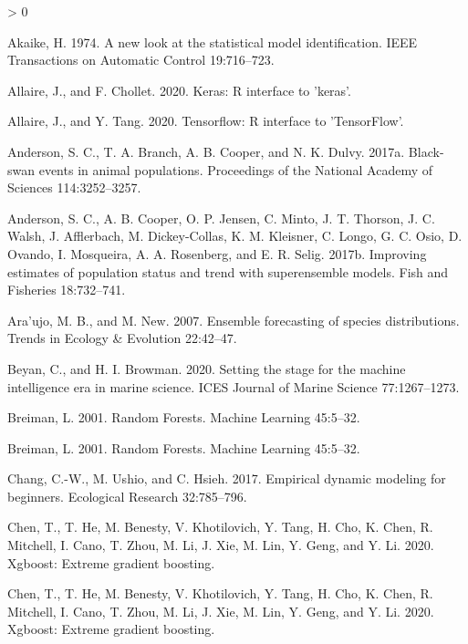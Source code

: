 \documentclass[
]{article}
\newlength{\cslhangindent}
\newenvironment{CSLReferences}[2] %
 {%
  \setlength{\parindent}{0pt}
  \ifodd #1 \everypar{\setlength{\hangindent}{\cslhangindent}}\ignorespaces\fi
  \ifnum #2 > 0
  \setlength{\parskip}{#2\baselineskip}
  \fi
 }%
 {}
\begin{document}
\hypertarget{refs}{}
\begin{CSLReferences}{1}{0}
\leavevmode\hypertarget{ref-akaike1974}{}%
Akaike, H. 1974. A new look at the statistical model identification. IEEE Transactions on Automatic Control 19:716--723.

\leavevmode\hypertarget{ref-allaire2020a}{}%
Allaire, J., and F. Chollet. 2020. Keras: R interface to 'keras'.

\leavevmode\hypertarget{ref-allaire2020}{}%
Allaire, J., and Y. Tang. 2020. Tensorflow: R interface to 'TensorFlow'.

\leavevmode\hypertarget{ref-anderson2017c}{}%
Anderson, S. C., T. A. Branch, A. B. Cooper, and N. K. Dulvy. 2017a. Black-swan events in animal populations. Proceedings of the National Academy of Sciences 114:3252--3257.

\leavevmode\hypertarget{ref-anderson2017a}{}%
Anderson, S. C., A. B. Cooper, O. P. Jensen, C. Minto, J. T. Thorson, J. C. Walsh, J. Afflerbach, M. Dickey-Collas, K. M. Kleisner, C. Longo, G. C. Osio, D. Ovando, I. Mosqueira, A. A. Rosenberg, and E. R. Selig. 2017b. Improving estimates of population status and trend with superensemble models. Fish and Fisheries 18:732--741.

\leavevmode\hypertarget{ref-araujo2007}{}%
Ara'ujo, M. B., and M. New. 2007. Ensemble forecasting of species distributions. Trends in Ecology \& Evolution 22:42--47.

\leavevmode\hypertarget{ref-beyan2020}{}%
Beyan, C., and H. I. Browman. 2020. Setting the stage for the machine intelligence era in marine science. ICES Journal of Marine Science 77:1267--1273.

\leavevmode\hypertarget{ref-breiman2001}{}%
Breiman, L. 2001. Random {Forests}. Machine Learning 45:5--32.

\leavevmode\hypertarget{ref-breiman2001}{}%
Breiman, L. 2001. Random {Forests}. Machine Learning 45:5--32.

\leavevmode\hypertarget{ref-chang2017}{}%
Chang, C.-W., M. Ushio, and C. Hsieh. 2017. Empirical dynamic modeling for beginners. Ecological Research 32:785--796.

\leavevmode\hypertarget{ref-chen2020}{}%
Chen, T., T. He, M. Benesty, V. Khotilovich, Y. Tang, H. Cho, K. Chen, R. Mitchell, I. Cano, T. Zhou, M. Li, J. Xie, M. Lin, Y. Geng, and Y. Li. 2020. Xgboost: Extreme gradient boosting.

\leavevmode\hypertarget{ref-chen2020}{}%
Chen, T., T. He, M. Benesty, V. Khotilovich, Y. Tang, H. Cho, K. Chen, R. Mitchell, I. Cano, T. Zhou, M. Li, J. Xie, M. Lin, Y. Geng, and Y. Li. 2020. Xgboost: Extreme gradient boosting.


\end{CSLReferences}
\end{document}
